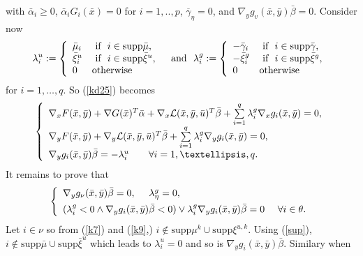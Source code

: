 	with
	$\bar{\alpha}_{i}  \geq0$, $\bar{\alpha}_{i}G_{i}(\bar{x})=0$ for $i=1,..,p$, 
    $\overline{\gamma}_{\eta}  =0$, and $\nabla_{y}g_{v}(\bar{x},\bar{y})\bar{\beta}=0$.
	Consider now
	\[
	\lambda_{i}^{u}:=\left\{
	\begin{array}
	[c]{ll}
	\bar{\mu}_{i} & \mbox{ if }\text{ }i\in\mathrm{supp}\bar{\mu},\text{\medskip}\\
	\bar{\xi}_{i}^{u} & \mbox{ if }\text{ }i\in\mathrm{supp}\bar{\xi}%
	^{u},\text{\medskip}\\
	0 & \mbox{otherwise}
	\end{array}
	\right.  \text{ \ and\ \ }\lambda_{i}^{g}:=\left\{
	\begin{array}
	[c]{ll}%
	-\bar{\gamma}_{i} & \mbox{ if }\text{ }i\in\mathrm{supp}\bar{\gamma
	},\text{\medskip}\\
	-\bar{\xi}_{i}^{g} & \mbox{ if }\text{ }i\in\mathrm{supp}\bar{\xi}
	^{g},\text{\medskip}\\
	0 & \mbox{otherwise}
	\end{array}
	\right.
	\]
	for $i=1,\ldots,q$. So (\ref{kd25}) becomes
	\[
	\left\{
	\begin{array}
	[c]{l}
	\nabla_{x}F(\bar{x},\bar{y})+\nabla G(\bar{x})^{T}\bar{\alpha}+\nabla
	_{x}\mathcal{L}(\bar{x},\bar{y},\bar{u})^{T}\bar{\beta}+\sum\limits_{i=1}
	^{q}\lambda_{i}^{g}\nabla_{x}g_{i}(\bar{x},\bar{y})=0,\\[1ex]
	\nabla_{y}F(\bar{x},\bar{y})+\nabla_{y}\mathcal{L}(\bar{x},\bar{y},\bar
	{u})^{T}\bar{\beta}+\sum\limits_{i=1}^{q}\lambda_{i}^{g}\nabla_{y}g_{i}
	(\bar{x},\bar{y})=0,\\[1ex]
	\nabla_{y}g_{i}(\bar{x},\bar{y})\bar{\beta}=-\lambda_{i}^{u}\text{
		\ \ \ \ \ }\forall i=1,\ldots,q.
	\end{array}
	\right.
	\]
	It remains to prove that
	\[
	\left\{
	\begin{array}
	[c]{l}
	\nabla_{y}g_{\nu}(\bar{x},\bar{y})\bar{\beta}=0,\text{ \ \ \ }\lambda_{\eta
	}^{g}=0,\\[1ex]
	(\lambda_{i}^{g}<0\wedge\nabla_{y}g_{i}(\bar{x},\bar{y})\bar{\beta}
	<0)\vee\lambda_{i}^{g}\nabla_{y}g_{i}(\bar{x},\bar{y})\bar{\beta}=0\text{
		\ \ \ }\forall i\in\theta.
	\end{array}
	\right.
	\]
	Let $i\in\nu$ so from (\ref{k7}) and (\ref{k9},) $i\notin\mathrm{supp}\mu
	^{k}\cup\mathrm{supp}\xi^{u,k}$. Using (\ref{sup}), $i\notin\mathrm{supp}%
	\bar{\mu}\cup\mathrm{supp}\bar{\xi}^{u}$ which leads to $\lambda_{i}^{u}=0$
	and so is $\nabla_{y}g_{i}(\bar{x},\bar{y})\bar{\beta}.$ Similary when
